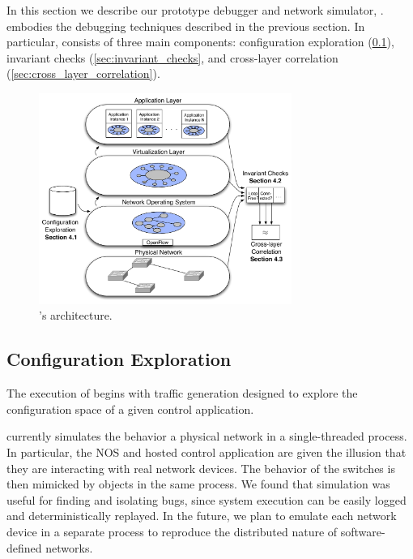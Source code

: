 
In this section we describe our prototype debugger and network simulator, \projectname{}.
\projectname{} embodies the debugging techniques described in the previous section.
In particular, \projectname{} consists of three main components: configuration exploration
(\ref{sec:configuration_exploration}), invariant checks
(\ref{sec:invariant_checks}, and cross-layer correlation
(\ref{sec:cross_layer_correlation}).


\begin{figure}[t]
    \hspace{-10pt}
    \includegraphics[width=3.25in]{../diagrams/architecture/Architecture_simplified.pdf}
    \caption[]{\label{fig:basicarch} \projectname{}'s architecture. \vspace{-10pt}} 
\end{figure}

\subsection{Configuration Exploration}
\label{sec:configuration_exploration}

The execution of \projectname{} begins with traffic generation designed to explore the configuration
space of a given control application. 

\projectname{} currently simulates the behavior a physical network in a single-threaded process.
In particular, the NOS and hosted control application are given the illusion that
they are interacting with real network devices. The behavior of the
switches is then mimicked by objects in the same process. We found that
simulation was useful for finding and isolating bugs, since system execution
can be easily logged and deterministically replayed. In the future, we plan to
emulate each network device in a separate process to reproduce the distributed
nature of software-defined networks.


